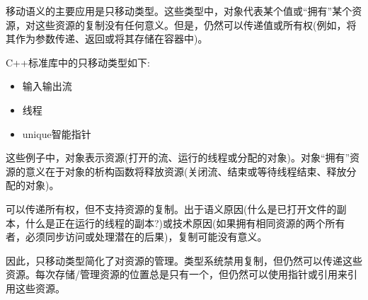 移动语义的主要应用是只移动类型。这些类型中，对象代表某个值或“拥有”某个资源，对这些资源的复制没有任何意义。但是，仍然可以传递值或所有权(例如，将其作为参数传递、返回或将其存储在容器中)。\par

C++标准库中的只移动类型如下:\par

\begin{itemize}
	\item 输入输出流
	\item 线程
	\item unique智能指针
\end{itemize}

这些例子中，对象表示资源(打开的流、运行的线程或分配的对象)。对象“拥有”资源的意义在于对象的析构函数将释放资源(关闭流、结束或等待线程结束、释放分配的对象)。\par

可以传递所有权，但不支持资源的复制。出于语义原因(什么是已打开文件的副本，什么是正在运行的线程的副本?)或技术原因(如果拥有相同资源的两个所有者，必须同步访问或处理潜在的后果)，复制可能没有意义。\par

因此，只移动类型简化了对资源的管理。类型系统禁用复制，但仍然可以传递这些资源。每次存储/管理资源的位置总是只有一个，但仍然可以使用指针或引用来引用这些资源。\par
























































